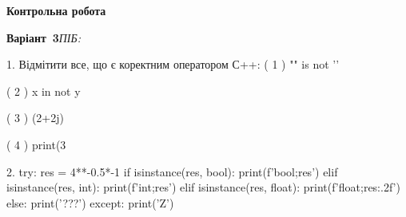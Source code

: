 \documentclass[11pt]{article}
\begin{document}
{\large\textbf{Контрольна робота}}

\textbf{Варіант \No\,3}\hfill \textit{ПІБ:}\,\underline{\hspace{60mm}}
\vspace{4mm}

1. %
Відмітити все, що є коректним оператором С++:
( 1 ) "\n" is not '\n'

( 2 ) x in not y

( 3 ) (2+2j)%

( 4 ) print(3%


2. 
try:
    res = 4**-0.5*-1
    if isinstance(res, bool):
        print(f'bool;{res}')
    elif isinstance(res, int):
        print(f'int;{res}')
    elif isinstance(res, float):
        print(f'float;{res:.2f}')
    else:
        print('???')
except:
    print('Z')


\newpage
\end{document}
